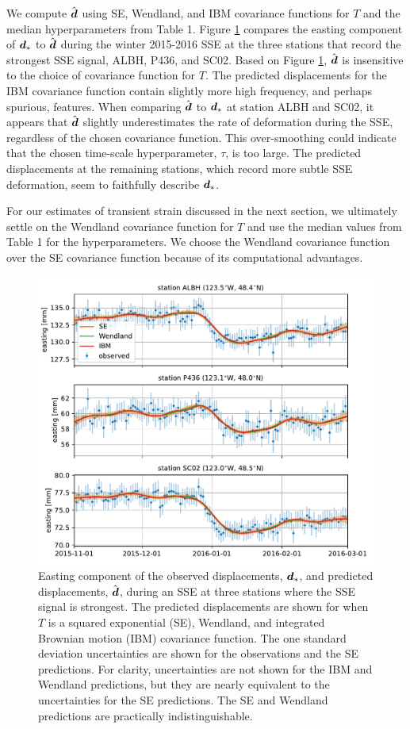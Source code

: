 \documentclass[extra,mreferee]{gji}
\begin{document}
We compute $\hat{\mitbf{d}}$ using SE, Wendland, and IBM covariance functions for $T$ and the median hyperparameters from Table 1. Figure \ref{fig:Fit} compares the easting component of $\mitbf{d}_*$ to $\hat{\mitbf{d}}$ during the winter 2015-2016 SSE at the three stations that record the strongest SSE signal, ALBH, P436, and SC02. Based on Figure \ref{fig:Fit}, $\hat{\mitbf{d}}$ is insensitive to the choice of covariance function for $T$. The predicted displacements for the IBM covariance function contain slightly more high frequency, and perhaps spurious, features. When comparing $\hat{\mitbf{d}}$ to $\mitbf{d}_*$ at station ALBH and SC02, it appears that $\hat{\mitbf{d}}$ slightly underestimates the rate of deformation during the SSE, regardless of the chosen covariance function. This over-smoothing could indicate that the chosen time-scale hyperparameter, $\tau$, is too large. The predicted displacements at the remaining stations, which record more subtle SSE deformation, seem to faithfully describe $\mitbf{d}_*$. 

For our estimates of transient strain discussed in the next section, we ultimately settle on the Wendland covariance function for $T$ and use the median values from Table 1 for the hyperparameters. We choose the Wendland covariance function over the SE covariance function because of its computational advantages.     

\begin{figure}
\includegraphics{figures/signal_fit/signal-fit.pdf}
\caption{Easting component of the observed displacements, $\mitbf{d}_*$, and predicted displacements, $\hat{\mitbf{d}}$, during an SSE at three stations where the SSE signal is strongest. The predicted displacements are shown for when $T$ is a squared exponential (SE), Wendland, and integrated Brownian motion (IBM) covariance function. The one standard deviation uncertainties are shown for the observations and the SE predictions. For clarity, uncertainties are not shown for the IBM and Wendland predictions, but they are nearly equivalent to the uncertainties for the SE predictions. The SE and Wendland predictions are practically indistinguishable.}   
\label{fig:Fit}
\end{figure}
\end{document}
